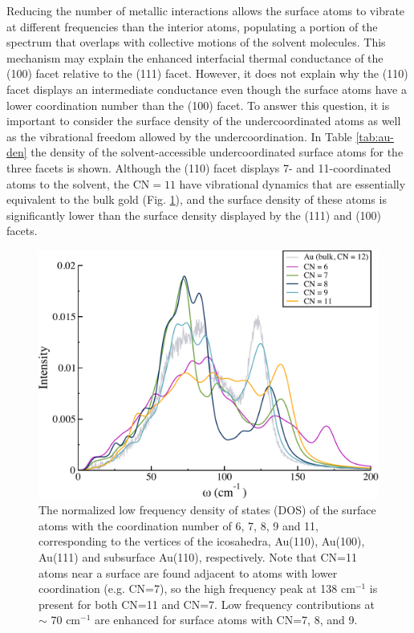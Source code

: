 Reducing the number of metallic interactions allows the surface atoms
to vibrate at different frequencies than the interior atoms,
populating a portion of the spectrum that overlaps with collective
motions of the solvent molecules. This mechanism may explain the
enhanced interfacial thermal conductance of the (100) facet relative
to the (111) facet. However, it does not explain why the (110) facet
displays an intermediate conductance even though the surface atoms
have a lower coordination number than the (100) facet.  To answer this
question, it is important to consider the surface density of the
undercoordinated atoms as well as the vibrational freedom allowed by
the undercoordination. In Table \ref{tab:au-den} the density
of the solvent-accessible undercoordinated surface atoms for the three
facets is shown. Although the (110) facet displays 7- and 11-coordinated atoms
to the solvent, the $\text{CN}=11$ have vibrational dynamics that are
essentially equivalent to the bulk gold (Fig. \ref{fig:cn-spect}), and the
surface density of these atoms is significantly lower than the surface
density displayed by the (111) and (100) facets.

\begin{figure}[!htb]
  \includegraphics[width=5in]{figures/surface-cn.pdf}
  \caption{The normalized low frequency density of states (DOS) of the
    surface atoms with the coordination number of 6, 7, 8, 9 and 11,
    corresponding to the vertices of the icosahedra, Au(110), Au(100),
    Au(111) and subsurface Au(110), respectively.  Note that CN=11
    atoms near a surface are found adjacent to atoms with lower
    coordination (e.g. CN=7), so the high frequency peak at 138
    cm$^{-1}$ is present for both CN=11 and CN=7.  Low frequency
    contributions at $\sim$ 70 cm$^{-1}$ are enhanced for surface
    atoms with CN=7, 8, and 9.}
  \label{fig:cn-spect}
\end{figure}

